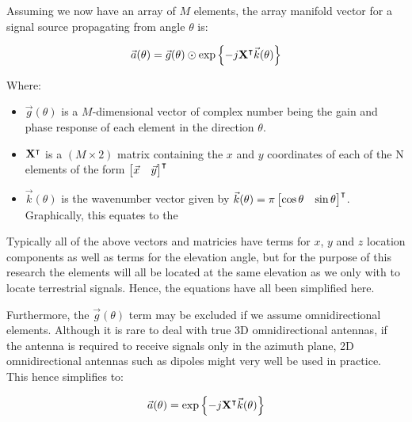 Assuming we now have an array of \(M\) elements, the array manifold vector for a signal source propagating from angle \(\theta\) is: \cite{dacos1995estimating}

\begin{equation}
\vec{a}(\theta) = \vec{g}(\theta) \odot \exp \left\{ -j \mathbf{X}^\intercal \vec{k}(\theta) \right\}
\end{equation}

Where:
\begin{itemize}
  \item \(\vec{g}(\theta)\) is a \(M\)-dimensional vector of complex number being the gain and phase response  of each element in the direction \(\theta\). 
\item \(\mathbf{X}^\intercal\) is a \((M \times 2)\) matrix containing the \(x\) and \(y\) coordinates of each of the N elements of the form \(\begin{bmatrix} \vec{x} & \vec{y} \end{bmatrix}^\intercal\)
\item \(\vec{k}(\theta)\) is the wavenumber vector given by \(\vec{k}(\theta) = \pi \begin{bmatrix} \cos\theta & \sin\theta \end{bmatrix}^\intercal \). Graphically, this equates to the 
\end{itemize}

Typically all of the above vectors and matricies have terms for \(x\), \(y\) and \(z\) location components as well as terms for the elevation angle, but for the purpose of this research the elements will all be located at the same elevation as we only with to locate terrestrial signals. Hence, the equations have all been simplified here.

Furthermore, the \(\vec{g}(\theta)\) term may be excluded if we assume omnidirectional elements. Although it is rare to deal with true 3D omnidirectional antennas, if the antenna is required to receive signals only in the azimuth plane, 2D omnidirectional antennas such as dipoles might very well be used in practice. This hence simplifies to:

\begin{equation}
  \vec{a}(\theta) = \exp \left\{ -j \mathbf{X}^\intercal \vec{k}(\theta) \right\}
\end{equation}

